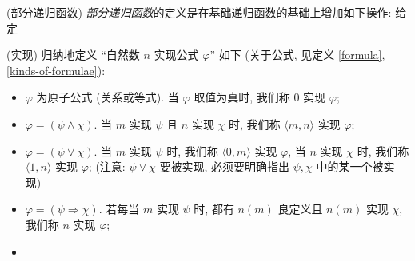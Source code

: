 \begin{definition}
	{(部分递归函数)}
	\emph{部分递归函数}的定义是在基础递归函数的基础上增加如下操作: 给定\todo{}
\end{definition}


\begin{definition}
	{(实现)}
	归纳地定义 ``自然数 $n$ 实现公式 $\varphi$'' 如下 (关于公式, 见定义 \ref{formula}, \ref{kinds-of-formulae}):
	\begin{itemize}
		\item $\varphi$ 为原子公式 (关系或等式). 当 $\varphi$ 取值为真时, 我们称 $0$ 实现 $\varphi$;
		\item $\varphi = (\psi \land \chi)$. 当 $m$ 实现 $\psi$ 且 $n$ 实现 $\chi$ 时, 我们称 $\langle m,n\rangle$ 实现 $\varphi$;
		\item $\varphi = (\psi \lor \chi)$. 当 $m$ 实现 $\psi$ 时, 我们称 $\langle 0,m\rangle$ 实现 $\varphi$, 当 $n$ 实现 $\chi$ 时, 我们称 $\langle 1,n\rangle$ 实现 $\varphi$; (注意: $\psi\lor\chi$ 要被实现, 必须要明确指出 $\psi,\chi$ 中的某一个被实现)
		\item $\varphi = (\psi \Rightarrow \chi)$. 若每当 $m$ 实现 $\psi$ 时, 都有 $n(m)$ 良定义且 $n(m)$ 实现 $\chi$, 我们称 $n$ 实现 $\varphi$;
		\item \todo{}
	\end{itemize}
\end{definition}